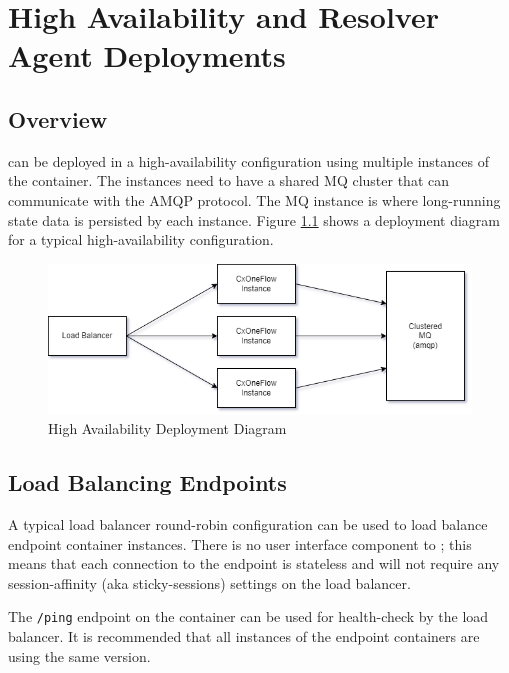 \chapter{High Availability and Resolver Agent Deployments}
\label{sec:high-availability}

\section{Overview}

\cxoneflow can be deployed in a high-availability configuration using multiple instances of
the \cxoneflow container.  The \cxoneflow instances need to have a shared MQ cluster that
can communicate with the AMQP protocol.  The MQ instance is where long-running state data
is persisted by each instance.  Figure \ref{fig:ha-diagram} shows a deployment diagram for
a typical high-availability configuration.


\begin{figure}[h]
    \includegraphics[width=\textwidth]{graphics/cxoneflow-diagrams-HA.png}
    \caption{High Availability Deployment Diagram}
    \label{fig:ha-diagram}
\end{figure}


\section{Load Balancing \cxoneflowtext\space Endpoints}

A typical load balancer round-robin configuration can be used to load balance \cxoneflow endpoint container instances.
There is no user interface component to \cxoneflow; this means that each connection to the \cxoneflow endpoint is stateless
and will not require any session-affinity (aka sticky-sessions) settings on the load balancer.

The \texttt{/ping} endpoint on the \cxoneflow container can be used for health-check by the load balancer.  
It is recommended that all instances of the \cxoneflow endpoint containers are using the same version.

